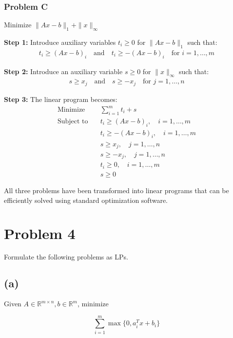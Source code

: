\documentclass{article}
\begin{document}
\subsubsection*{Problem C}

Minimize $\|Ax - b\|_1 + \|x\|_\infty$

\textbf{Step 1:} Introduce auxiliary variables $t_i \geq 0$ for $\|Ax - b\|_1$ such that:
\begin{align*}
    t_i \geq (Ax - b)_i \quad \text{and} \quad t_i \geq -(Ax - b)_i \quad \text{for } i = 1, \dots, m
\end{align*}

\textbf{Step 2:} Introduce an auxiliary variable $s \geq 0$ for $\|x\|_\infty$ such that:
\begin{align*}
    s \geq x_j \quad \text{and} \quad s \geq -x_j \quad \text{for } j = 1, \dots, n
\end{align*}

\textbf{Step 3:} The linear program becomes:
\begin{align*}
    \text{Minimize} \quad & \sum_{i=1}^m t_i + s \\
    \text{Subject to} \quad & t_i \geq (Ax - b)_i, \quad i = 1, \dots, m \\
    & t_i \geq -(Ax - b)_i, \quad i = 1, \dots, m \\
    & s \geq x_j, \quad j = 1, \dots, n \\
    & s \geq -x_j, \quad j = 1, \dots, n \\
    & t_i \geq 0, \quad i = 1, \dots, m \\
    & s \geq 0
\end{align*}

All three problems have been transformed into linear programs that can be efficiently solved using standard optimization software.

\section*{Problem 4}

Formulate the following problems as LPs.

\subsection*{(a)}

Given $A \in \mathbb{R}^{m\times n}, b \in \mathbb{R}^m$, minimize

\[
\sum_{i=1}^m \max\{0, a_i^T x + b_i\}
\]
\end{document}
